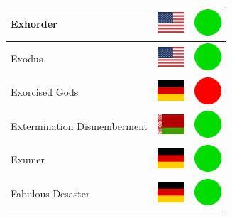 \documentclass[12pt, a4paper, twoside]{report}
\begin{document}
\begin{center}
\begin{longtable}{|p{5cm}|p{2cm}|p{2cm}|}
			Exhorder & \includegraphics[width=1cm]{4x3/us} & \includegraphics[width=1cm]{likes/y} \\ \hline
			Exodus & \includegraphics[width=1cm]{4x3/us} & \includegraphics[width=1cm]{likes/y} \\ \hline
			Exorcised Gods & \includegraphics[width=1cm]{4x3/de} & \includegraphics[width=1cm]{likes/n} \\ \hline
			Extermination Dismemberment & \includegraphics[width=1cm]{4x3/by} & \includegraphics[width=1cm]{likes/y} \\ \hline
			Exumer & \includegraphics[width=1cm]{4x3/de} & \includegraphics[width=1cm]{likes/y} \\ \hline
			Fabulous Desaster & \includegraphics[width=1cm]{4x3/de} & \includegraphics[width=1cm]{likes/y} \\ \hline

\end{longtable}
\end{center}
\end{document}
